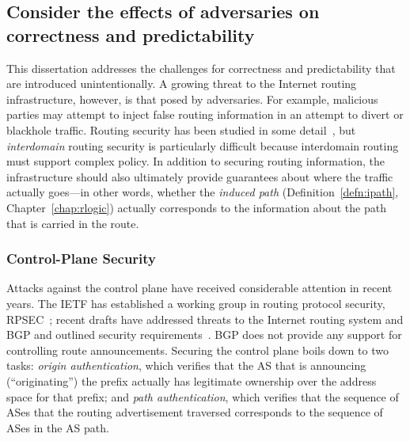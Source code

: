 








\subsection{Consider the effects of adversaries on correctness
and predictability}
\label{sec:concl:security}

This dissertation addresses the challenges for correctness and
predictability that are introduced unintentionally.  A growing threat to
the Internet routing infrastructure, however, is that posed by
adversaries.  For example, malicious parties may attempt to inject false
routing information in an attempt to divert or blackhole traffic.
Routing security has been studied in some detail~\cite{perlman88}, but
{\em interdomain} routing security is particularly difficult because
interdomain routing must support complex policy.  In addition to
securing routing information, the infrastructure should also ultimately
provide guarantees about where the traffic actually goes---in other
words, whether the {\em induced path} (Definition~\ref{defn:ipath},
Chapter~\ref{chap:rlogic}) actually corresponds to the information about
the path that is carried in the route.


\subsubsection{Control-Plane Security}

Attacks against the control plane have received considerable attention
in recent years.  The IETF has established a working group in routing
protocol security, RPSEC~\cite{rpsec-wg}; recent drafts have addressed
threats to the Internet routing system and BGP and outlined security
requirements~\cite{id-routing-threats}.  BGP does not provide any
support for controlling route announcements.  Securing the control plane
boils down to two tasks: {\em origin authentication}, which verifies
that the AS that is announcing (``originating'') the prefix actually has
legitimate ownership over the address space for that prefix; and {\em
path authentication}, which verifies that the sequence of ASes that the
routing advertisement traversed corresponds to the sequence of ASes in
the AS path.

